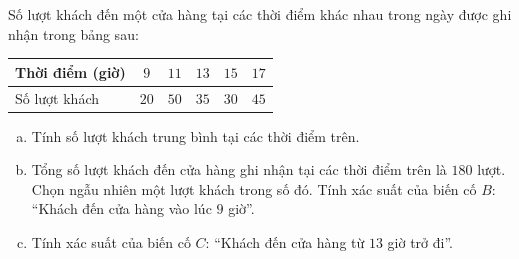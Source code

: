 \begin{bt}%
Số lượt khách đến một cửa hàng tại các thời điểm khác nhau trong ngày được ghi nhận trong bảng sau:
\begin{center}
\begin{tabular}{|l|c|c|c|c|c|}
	\hline
	Thời điểm (giờ) & $9$ & $11$ & $13$ & $15$ & $17$ \\ \hline
	Số lượt khách & $20$ & $50$ & $35$ & $30$ & $45$ \\ \hline
\end{tabular}
\end{center}
\begin{enumerate}[a)]
	\item Tính số lượt khách trung bình tại các thời điểm trên.
	\item Tổng số lượt khách đến cửa hàng ghi nhận tại các thời điểm trên là $180$ lượt. Chọn ngẫu nhiên một lượt khách trong số đó. Tính xác suất của biến cố $B$: ``Khách đến cửa hàng vào lúc $9$ giờ''.
	\item Tính xác suất của biến cố $C$: ``Khách đến cửa hàng từ $13$ giờ trở đi''.
\end{enumerate}
\end{bt}

